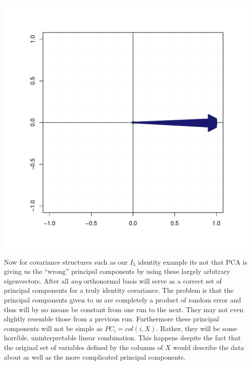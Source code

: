 \documentclass{book}
\begin{document}
\begin{center}
\includegraphics[scale=.3]{./Figures/e2.pdf}%
\end{center}


Now for covariance structures such as our $I_5$ identity example its not that PCA is giving us the ``wrong'' principal components by using these largely arbitrary eigenvectors. After all \emph{any} orthonormal basis will serve as a correct set of principal components for a truly identity covariance. The problem is that the principal components given to us are completely a product of random error and thus will by no means be constant from one run to the next. They may not even slightly resemble those from a previous run. Furthermore these principal components will not be simple as $PC_i=col(i,X)$. Rather, they will be some horrible, uninterpretable linear combination. This happens despite the fact that the original set of variables defined by the columns of $X$ would describe the data about as well as the more complicated principal components. 
\end{document}
